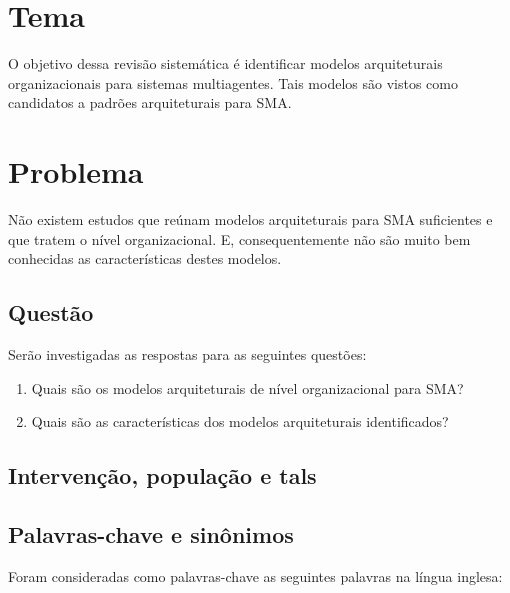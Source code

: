 
\section{Tema}

O objetivo dessa revisão sistemática é identificar modelos arquiteturais organizacionais para sistemas multiagentes. Tais modelos são vistos como candidatos a padrões arquiteturais para SMA.

\section{Problema}

Não existem estudos que reúnam modelos arquiteturais para SMA suficientes e que tratem o nível organizacional. E, consequentemente não são muito bem conhecidas as características destes modelos.

\subsection{Questão}

Serão investigadas as respostas para as seguintes questões:

\begin{enumerate}
    \item Quais são os modelos arquiteturais de nível organizacional para SMA?
    \item Quais são as características dos modelos arquiteturais identificados?
\end{enumerate}

\subsection{Intervenção, população e tals}

\subsection{Palavras-chave e sinônimos}

Foram consideradas como palavras-chave as seguintes palavras na língua inglesa:

